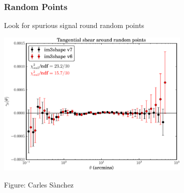 \documentclass{beamer}
\begin{document}
\frame
{
    \frametitle{Random Points}

    Look for spurious signal round random points

    \begin{center}
        \includegraphics[width=0.7\textwidth]{random_points_v6_v7_crop.pdf}
    \end{center}
    {\tiny Figure: Carles S\`{a}nchez}
}
\end{document}
